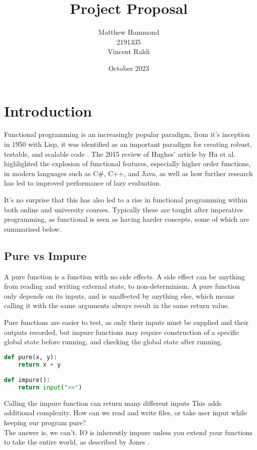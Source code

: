 \documentclass[a4paper]{article}
\title{Project Proposal}
\author{Matthew Hammond\\2191335\\Vincent Rahli}
\date{October 2023}
\begin{document}
\maketitle

\section{Introduction}
Functional programming is an increasingly popular paradigm, from it's inception in 1950 with Lisp, it was identified as an important paradigm for creating robust, testable, and scalable code \cite{10.1093/comjnl/32.2.98}. The 2015 review of Hughes' article by Hu et al. \cite{10.1093/nsr/nwv042} highlighted the explosion of functional features, especially higher order functions, in modern languages such as C\#, C++, and Java, as well as how further research has led to improved performance of lazy evaluation.

It's no surprise that this has also led to a rise in functional programming within both online and university courses. \cite{warwickFP, kentFP, birminghamFP, courseraFP} Typically these are taught after imperative programming, as functional is seen as having harder concepts, some of which are summarised below.
\subsection{Pure vs Impure}
A pure function is a function with no side effects. A side effect can be anything from reading and writing external state, to non-determinism. A pure function only depends on its inputs, and is unaffected by anything else, which means calling it with the same arguments always result in the same return value.

Pure functions are easier to test, as only their inputs must be supplied and their outputs recorded, but impure functions may require construction of a specific global state before running, and checking the global state after running.
\begin{lstlisting}[language=python, caption=A pure and impure function.]
def pure(x, y):
    return x + y

def impure():
    return input(">>")
\end{lstlisting}
Calling the impure function can return many different inputs
This adds additional complexity. How can we read and write files, or take user input while keeping our program pure?\\
The answer is, we can't. IO is inherently impure unless you extend your functions to take the entire world, as described by Jones \cite{peytonjones2001tackling}.
\end{document}
